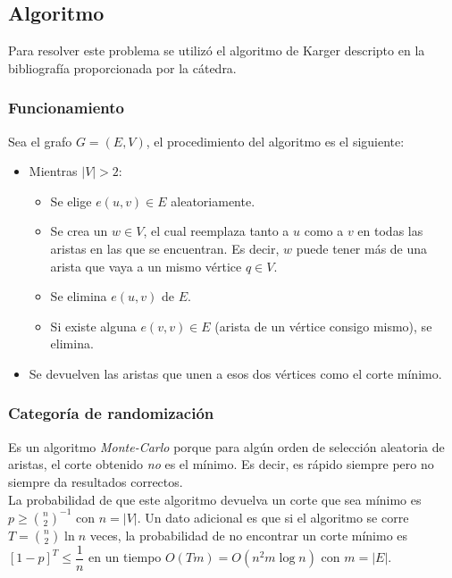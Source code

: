 \documentclass[a4paper, 10pt]{article}
\newcommand\tab[1][0.5cm]{\hspace*{#1}}
\begin{document}
        \subsection{Algoritmo}
                Para resolver este problema se utilizó el algoritmo de Karger descripto en
            la bibliografía proporcionada por la cátedra.
            \subsubsection{Funcionamiento}
                Sea el grafo $G = (E, V)$, el procedimiento del algoritmo es el siguiente:
                \begin{itemize}
                    \item Mientras $|V| > 2$:
                    \begin{itemize}
                        \item Se elige $e(u, v) \in E$ aleatoriamente.
                        \item Se crea un $w \in V$, el cual reemplaza tanto a $u$ como a $v$ en todas
                        las aristas en las que se encuentran. Es decir, $w$ puede tener más de una arista
                        que vaya a un mismo vértice $q \in V$.
                        \item Se elimina $e(u, v)$ de $E$.
                        \item Si existe alguna $e(v, v) \in E$ (arista de un vértice consigo mismo), se elimina.
                    \end{itemize}
                    \item Se devuelven las aristas que unen a esos dos vértices como el corte mínimo.
                \end{itemize}
            \subsubsection{Categoría de randomización}
                    Es un algoritmo \emph{Monte-Carlo} porque para algún orden de selección aleatoria
                de aristas, el corte obtenido \emph{no} es el mínimo. Es decir, es rápido siempre pero no siempre
                da resultados correctos. \\
                \tab La probabilidad de que este algoritmo devuelva un corte que sea mínimo es $p \geqslant \binom{n}{2}^{-1}$
                con $n = |V|$. Un dato adicional es que si el algoritmo se corre $T = \binom{n}{2}\ln{n}$ veces,
                la probabilidad de no encontrar un corte mínimo es $[1-p]^T \leqslant \dfrac{1}{n}$ en un tiempo
                $O(Tm) = O(n^2m\log{n})$ con $m = |E|$.
    \newpage
\end{document}
